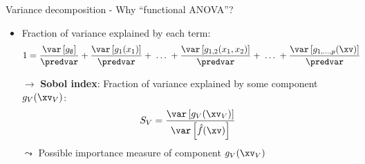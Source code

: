 \documentclass[11pt,compress,t,notes=noshow, aspectratio=169, xcolor=table]{beamer}
\newcommand{\open}{}
\newcommand{\close}{}
\begin{document}
\begin{frame}{Variance decomposition - Why ``functional ANOVA''?
}
\begin{itemize}[<+->]

\item Fraction of variance explained by each term:
\begin{align*}
1 &= \frac{\var\left[g_{\open \emptyset \close}\right]}{\predvar} + \frac{\var\left[g_{\open 1 \close}(x_1)\right]}{\predvar} + %
\;\dots\;
+ \frac{\var\left[g_{\open 1, 2 \close}(x_1, x_2)\right]}{\predvar} + \;\dots\; + \frac{\var\left[g_{\open 1,\ldots,p \close}(\xv)\right]}{\predvar}
\end{align*}

\item[$\rightarrow$] \textbf{Sobol index}: Fraction of variance explained by some component $g_{\open V \close}(\xv_V)$:
$$
S_V = \frac{\var\left[g_{\open V \close}(\xv_V)\right]}{\var\left[\hat{f}(\xv)\right]}
$$
$\leadsto$ Possible importance measure of component $g_{\open V \close}(\xv_V)$\\
\end{itemize}

\end{frame}



\endlecture
\end{document}

